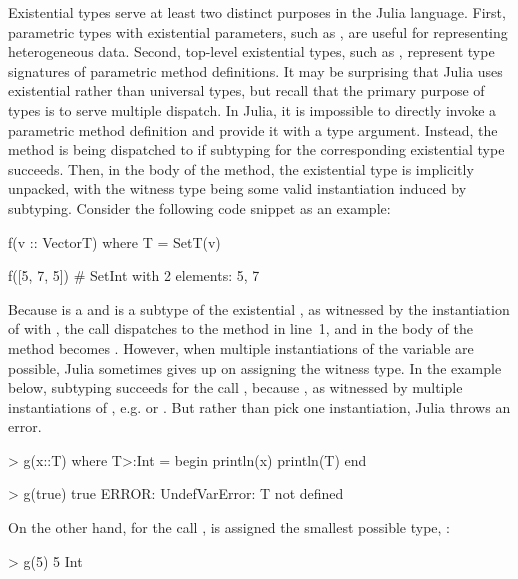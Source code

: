 Existential types serve at least two distinct purposes in the Julia language.
First, parametric types with existential parameters,
such as ,
are useful for representing heterogeneous data.
Second, top-level existential types, such as
, represent
type signatures of parametric method definitions.
It may be surprising that Julia uses existential rather than universal types,
but recall that the primary purpose of types is to serve multiple dispatch.
In Julia, it is impossible to directly invoke a parametric method definition
and provide it with a type argument. Instead, the method is being dispatched to if
subtyping for the corresponding existential type succeeds. Then, in the body of
the method, the existential type is implicitly unpacked, with the witness type
being some valid instantiation induced by subtyping.
Consider the following code snippet as an example:
\begin{codeenvd}
\begin{julia}
f(v :: Vector{T}) where T = Set{T}(v)

f([5, 7, 5]) # Set{Int} with 2 elements: 5, 7
\end{julia}
\end{codeenvd}
Because \cjl{[5, 7, 5]} is a  and
 is a subtype of the existential
,
as witnessed by the instantiation of  with ,
the call  dispatches to the method in line~1,
and  in the body of the method becomes .
However, when multiple instantiations of the variable are possible,
Julia sometimes gives up on assigning the witness type.
In the example below, subtyping succeeds for the call ,
because , as witnessed
by multiple instantiations of , e.g.  or
.
But rather than pick one instantiation, Julia throws an error.
\begin{codeenvd}
\begin{julia}
> g(x::T) where T>:Int = begin
    println(x)
    println(T)
  end

> g(true)
true
ERROR: UndefVarError: T not defined
\end{julia}
\end{codeenvd}
On the other hand, for the call ,  is assigned the smallest
possible type, :
\begin{codeenvd}
\begin{julia}
> g(5)
5
Int
\end{julia}
\end{codeenvd}

